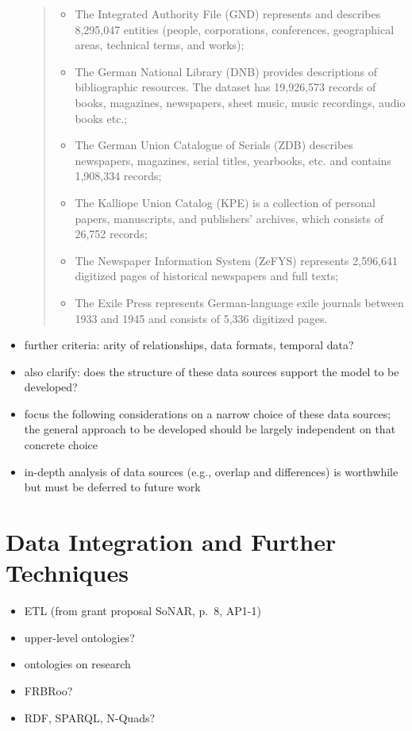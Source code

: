 \begin{itemize}
    \blockquote{%
      \begin{itemize}
        \item
          The Integrated Authority File (GND) represents and describes 8,295,047 entities (people, corporations, conferences, geographical areas, technical terms, and works);
        \item
          The German National Library (DNB) provides descriptions of bibliographic resources. The dataset has 19,926,573 records of books, magazines, newspapers, sheet music, music recordings, audio books etc.;
        \item
          The German Union Catalogue of Serials (ZDB) describes newspapers, magazines, serial titles, yearbooks, etc. and contains 1,908,334 records;
        \item
          The Kalliope Union Catalog (KPE) is a collection of personal papers, manuscripts, and publishers’ archives, which consists of 26,752 records;
        \item
          The Newspaper Information System (ZeFYS) represents 2,596,641 digitized pages of historical newspapers and full texts;
        \item
          The Exile Press represents German-language exile journals between 1933 and 1945 and consists of 5,336 digitized pages.
      \end{itemize}
    }
  \item
    further criteria: arity of relationships, data formats, temporal data?
  \item
    also clarify: does the structure of these data sources support the model to be developed?
  \item
    focus the following considerations on a narrow choice of these data sources;
    the general approach to be developed should be largely independent on that concrete choice
  \item 
    in-depth analysis of data sources (e.g., overlap and differences) is worthwhile
    but must be deferred to future work
\end{itemize}

\section{Data Integration and Further Techniques}
\label{sec:data_integration}

\begin{itemize}
  \item 
    ETL (from grant proposal \gls{SoNAR}, p.~8, AP1-1)
  \item
    upper-level ontologies?
  \item 
    ontologies on research
  \item
    FRBRoo?
  \item
    \gls{RDF}, \gls{SPARQL}, N-Quads?
\end{itemize}


